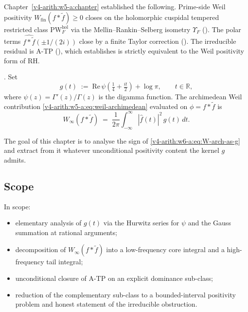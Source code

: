 Chapter~\ref{v4-arith:w5-a:chapter} established the following.
Prime-side Weil positivity \(W_{\mathrm{fin}}(f*\widetilde{f})\geq 0\)
closes on the holomorphic cuspidal tempered restricted class
\(\mathrm{PW}^{\mathrm{hol}}_{F}\) via the Mellin--Rankin--Selberg
isometry \(\Upsilon_{F}\)
(). The polar terms
\(\widehat{f*\widetilde{f}}(\pm 1/(2i))\) close by a finite Taylor
correction (). The irreducible
residual is A-TP
(), which
 establishes is
strictly equivalent to the Weil positivity form of RH.

\begin{definition}
\label{v4-arith:w6-a:def:g}
\ClaimStatusDefinitional. Set
\begin{equation}
\label{v4-arith:w6-a:eq:g-definition}
g(t)\;:=\;\mathrm{Re}\,\psi\!\left(\tfrac{1}{4}+\tfrac{it}{2}\right)+\log\pi,
\qquad t\in\mathbb{R},
\end{equation}
where \(\psi(z)=\Gamma'(z)/\Gamma(z)\) is the digamma function. The
archimedean Weil contribution
\eqref{v4-arith:w5-a:eq:weil-archimedean} evaluated on
\(\phi=f*\widetilde{f}\) is
\begin{equation}
\label{v4-arith:w6-a:eq:W-arch-as-g}
W_{\infty}(f*\widetilde{f})
\;=\;\frac{1}{2\pi}\int_{-\infty}^{\infty}|\widehat{f}(t)|^{2}\,g(t)\,dt.
\end{equation}
\end{definition}

The goal of this chapter is to analyse the sign of
\eqref{v4-arith:w6-a:eq:W-arch-as-g} and extract from it whatever
unconditional positivity content the kernel \(g\) admits.

\subsection{Scope}
\label{v4-arith:w6-a:scope}

In scope:
\begin{itemize}
\item elementary analysis of \(g(t)\) via the Hurwitz series for \(\psi\)
and the Gauss summation at rational arguments;
\item decomposition of \(W_{\infty}(f*\widetilde{f})\) into a
low-frequency core integral and a high-frequency tail integral;
\item unconditional closure of A-TP on an explicit dominance
sub-class;
\item reduction of the complementary sub-class to a bounded-interval
positivity problem and honest statement of the irreducible
obstruction.
\end{itemize}

